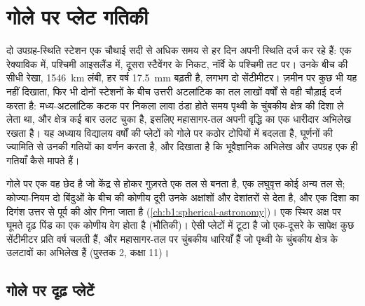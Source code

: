 \chapter{गोले पर प्लेट गतिकी}\label{ch:b1:plate-kinematics}

दो उपग्रह-स्थिति स्टेशन एक चौथाई सदी से अधिक समय से हर दिन अपनी स्थिति दर्ज कर रहे हैं: एक रेक्याविक में, पश्चिमी आइसलैंड में, दूसरा स्टैवेंगर के निकट, नॉर्वे के पश्चिमी तट पर। उनके बीच की सीधी रेखा, \qty{1546}{km} लंबी, हर वर्ष \qty{17.5}{mm} बढ़ती है, लगभग दो सेंटीमीटर। ज़मीन पर कुछ भी यह नहीं दिखाता, फिर भी दोनों स्टेशनों के बीच उत्तरी अटलांटिक का तल लाखों वर्षों से वही चौड़ाई दर्ज करता है: मध्य-अटलांटिक कटक पर निकला लावा ठंडा होते समय पृथ्वी के चुंबकीय क्षेत्र की दिशा ले लेता था, और क्षेत्र कई बार उलट चुका है, इसलिए महासागर-तल अपनी वृद्धि का एक धारीदार अभिलेख रखता है। यह अध्याय विद्यालय वर्षों की प्लेटों को गोले पर कठोर टोपियों में बदलता है, घूर्णनों की ज्यामिति से उनकी गतियों का वर्णन करता है, और दिखाता है कि भूवैज्ञानिक अभिलेख और उपग्रह एक ही गतियाँ कैसे मापते हैं।

\begin{recall}
गोले पर एक  वह छेद है जो केंद्र से होकर गुज़रते एक तल से बनता है, एक लघुवृत्त कोई अन्य तल से; कोज्या-नियम दो बिंदुओं के बीच की कोणीय दूरी उनके अक्षांशों और देशांतरों से देता है, और एक दिशा का दिगंश उत्तर से पूर्व की ओर गिना जाता है (\cref{ch:b1:spherical-astronomy})। एक स्थिर अक्ष पर घूमते दृढ़ पिंड का एक कोणीय वेग होता है (भौतिकी)।  ऐसी प्लेटों में टूटा है जो एक-दूसरे के सापेक्ष कुछ सेंटीमीटर प्रति वर्ष चलती हैं, और महासागर-तल पर चुंबकीय धारियाँ हैं जो पृथ्वी के चुंबकीय क्षेत्र के उलटावों का अभिलेख हैं (पुस्तक 2, कक्षा 11)।
\end{recall}

\section{गोले पर दृढ़ प्लेटें}

